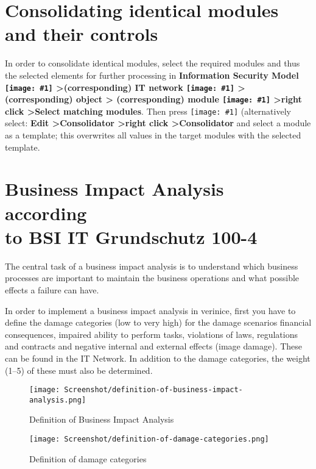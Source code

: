 \documentclass[a4paper,10pt]{book}
\newcommand{\icon}[1]{\texttt{[image: \#1]}}
\begin{document}
 \section{Consolidating identical modules and their controls}
 In order to consolidate identical modules, select the required modules and thus the
 selected elements for further processing in \textbf{Information Security Model
\icon{Icon/GS_Modell.png} \textgreater (corresponding) IT network
\icon{Icon/GS_Modell.png} \textgreater (corresponding) object \textgreater
(corresponding) module \icon{Icon/Baustein.png} \textgreater right click
\textgreater Select matching modules}. Then press \icon{Icon/Konsolidator.png}
(alternatively select: \textbf{Edit \textgreater Consolidator \textgreater right click \textgreater Consolidator}
and select a module as a template; this overwrites all values in the target modules with the selected template.


\section{Business Impact Analysis according\\ to BSI IT Grundschutz 100-4}
\label{sec:business-impact-analyse-nach-bsi-it-grundschutz-100-4}

The central task of a business impact analysis is to understand which business
processes are important to maintain the business operations and what possible
effects a failure can have.

In order to implement a business impact analysis in verinice, first you have to
define the damage categories (low to very high) for the damage scenarios
financial consequences, impaired ability to perform tasks, violations of laws,
regulations and contracts and negative internal and external effects (image
damage). These can be found in the IT Network. In addition to the damage
categories, the weight (1--5) of these must also be determined.

\begin{figure}[htb!]
  \centering
  \texttt{[image: Screenshot/definition-of-business-impact-analysis.png]}
  \caption{Definition of Business Impact Analysis}
  \label{fig:definition-of-business-impact-analysis}
\end{figure}

\begin{figure}[!htb]
  \centering
  \texttt{[image: Screenshot/definition-of-damage-categories.png]}
  \caption{Definition of damage categories}
  \label{fig:definition-of-damage-categories}
\end{figure}
\end{document}
